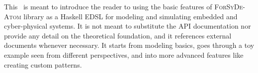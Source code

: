 This \SelfRef\ is meant to introduce the reader to using the basic features of \textsc{ForSyDe-Atom} library as a Haskell EDSL for modeling and simulating embedded and cyber-physical systems. It is not meant to substitute the API documentation nor provide any detail on the theoretical foundation, and it references external documents whenever necessary. It starts from modeling basics, goes through a toy example seen from different perspectives, and into more advanced features like creating custom patterns.